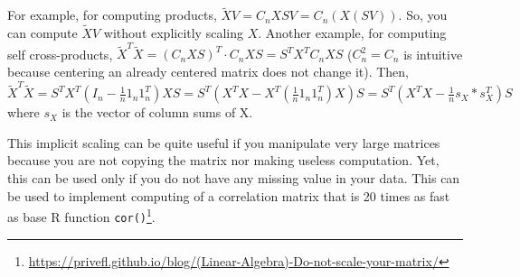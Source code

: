 For example, for computing products, $\tilde{X} V = C_n X S V = C_n (X (S V))$. So, you can compute $\tilde{X} V$ without explicitly scaling $X$. 
Another example, for computing self cross-products, $\tilde{X}^T \tilde{X} = (C_n X S)^T \cdot C_n X S = S^T X^T C_n X S$ ($C_n^2 = C_n$ is intuitive because centering an already centered matrix does not change it). Then, $\tilde{X}^T \tilde{X} = S^T X^T (I_n - \frac{1}{n} 1_n 1_n^T) X S = S^T (X^T X - X^T (\frac{1}{n} 1_n 1_n^T) X) S = S^T (X^T X - \frac{1}{n} s_X * s_X^T) S$ where $s_X$ is the vector of column sums of X.

This implicit scaling can be quite useful if you manipulate very large matrices because you are not copying the matrix nor making useless computation. Yet, this can be used only if you do not have any missing value in your data. 
This can be used to implement computing of a correlation matrix that is 20 times as fast as base R function \texttt{cor()}\footnote{\url{https://privefl.github.io/blog/(Linear-Algebra)-Do-not-scale-your-matrix/}}.
